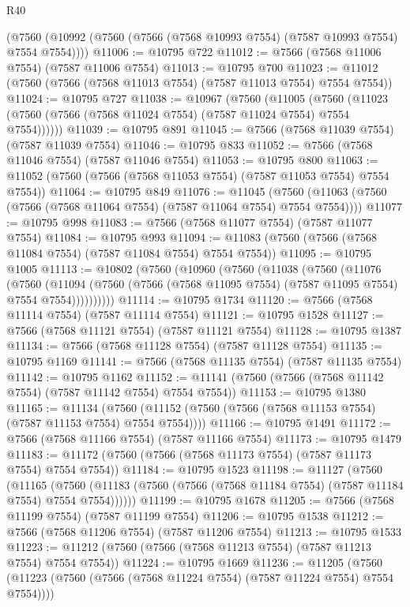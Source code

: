 \begin{lexlean}{R40}
\begin{coremodule}
    (@7560 (@10992 (@7560 (@7566 (@7568 @10993 @7554) (@7587 @10993 @7554) @7554 @7554))))
@11006 := @10795 @722
@11012 := @7566 (@7568 @11006 @7554) (@7587 @11006 @7554)
@11013 := @10795 @700
@11023 := @11012 (@7560 (@7566 (@7568 @11013 @7554) (@7587 @11013 @7554) @7554 @7554))
@11024 := @10795 @727
@11038 := @10967
    (@7560
      (@11005
        (@7560 (@11023 (@7560 (@7566 (@7568 @11024 @7554) (@7587 @11024 @7554) @7554 @7554))))))
@11039 := @10795 @891
@11045 := @7566 (@7568 @11039 @7554) (@7587 @11039 @7554)
@11046 := @10795 @833
@11052 := @7566 (@7568 @11046 @7554) (@7587 @11046 @7554)
@11053 := @10795 @800
@11063 := @11052 (@7560 (@7566 (@7568 @11053 @7554) (@7587 @11053 @7554) @7554 @7554))
@11064 := @10795 @849
@11076 := @11045
    (@7560 (@11063 (@7560 (@7566 (@7568 @11064 @7554) (@7587 @11064 @7554) @7554 @7554))))
@11077 := @10795 @998
@11083 := @7566 (@7568 @11077 @7554) (@7587 @11077 @7554)
@11084 := @10795 @993
@11094 := @11083 (@7560 (@7566 (@7568 @11084 @7554) (@7587 @11084 @7554) @7554 @7554))
@11095 := @10795 @1005
@11113 := @10802
    (@7560
      (@10960
        (@7560
          (@11038
            (@7560
              (@11076
                (@7560
                  (@11094
                    (@7560 (@7566 (@7568 @11095 @7554) (@7587 @11095 @7554) @7554 @7554))))))))))
@11114 := @10795 @1734
@11120 := @7566 (@7568 @11114 @7554) (@7587 @11114 @7554)
@11121 := @10795 @1528
@11127 := @7566 (@7568 @11121 @7554) (@7587 @11121 @7554)
@11128 := @10795 @1387
@11134 := @7566 (@7568 @11128 @7554) (@7587 @11128 @7554)
@11135 := @10795 @1169
@11141 := @7566 (@7568 @11135 @7554) (@7587 @11135 @7554)
@11142 := @10795 @1162
@11152 := @11141 (@7560 (@7566 (@7568 @11142 @7554) (@7587 @11142 @7554) @7554 @7554))
@11153 := @10795 @1380
@11165 := @11134
    (@7560 (@11152 (@7560 (@7566 (@7568 @11153 @7554) (@7587 @11153 @7554) @7554 @7554))))
@11166 := @10795 @1491
@11172 := @7566 (@7568 @11166 @7554) (@7587 @11166 @7554)
@11173 := @10795 @1479
@11183 := @11172 (@7560 (@7566 (@7568 @11173 @7554) (@7587 @11173 @7554) @7554 @7554))
@11184 := @10795 @1523
@11198 := @11127
    (@7560
      (@11165
        (@7560 (@11183 (@7560 (@7566 (@7568 @11184 @7554) (@7587 @11184 @7554) @7554 @7554))))))
@11199 := @10795 @1678
@11205 := @7566 (@7568 @11199 @7554) (@7587 @11199 @7554)
@11206 := @10795 @1538
@11212 := @7566 (@7568 @11206 @7554) (@7587 @11206 @7554)
@11213 := @10795 @1533
@11223 := @11212 (@7560 (@7566 (@7568 @11213 @7554) (@7587 @11213 @7554) @7554 @7554))
@11224 := @10795 @1669
@11236 := @11205
    (@7560 (@11223 (@7560 (@7566 (@7568 @11224 @7554) (@7587 @11224 @7554) @7554 @7554))))

\end{coremodule}
\end{lexlean}
